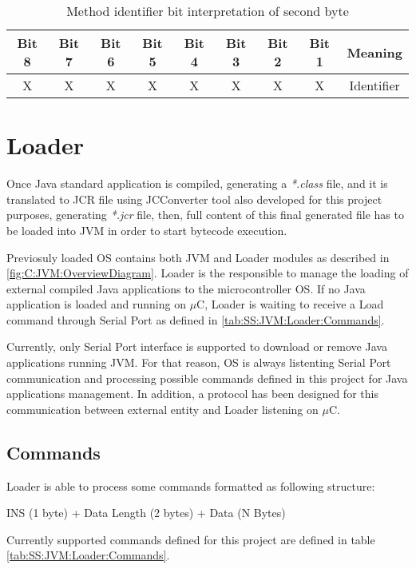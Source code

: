 \begin{table}[!htb]
\centering
\begin{tabular}{|c|c|c|c|c|c|c|c|c|}
\hline 
Bit 8 & Bit 7 & Bit 6 & Bit 5 & Bit 4 & Bit 3 & Bit 2 & Bit 1 & Meaning \\ 
\hline 
X & X & X & X & X & X & X & X & Identifier \\ 
\hline 
\end{tabular}
\caption{Method identifier bit interpretation of second byte}
\label{tab:SS:JVM:JCR:TransBytecodes}
\end{table}

\section{Loader}\label{S:JVM:Loader}
Once Java standard application is compiled, generating a \textit{*.class} file, and it is translated to JCR file using JCConverter tool also developed for this project purposes, generating \textit{*.jcr} file, then, full content of this final generated file has to be loaded into JVM in order to start bytecode execution.

Previosuly loaded OS contains both JVM and Loader modules as described in \ref{fig:C:JVM:OverviewDiagram}. Loader is the responsible to manage the loading of external compiled Java applications to the microcontroller OS. If no Java application is loaded and running on $\mu$C, Loader is waiting to receive a Load command through Serial Port as defined in \ref{tab:SS:JVM:Loader:Commands}.

Currently, only Serial Port interface is supported to download or remove Java applications running JVM. For that reason, OS is always listenting Serial Port communication and processing possible commands defined in this project for Java applications management. In addition, a protocol has been designed for this communication between external entity and Loader listening on $\mu$C.

\subsection{Commands}\label{SS:JVM:Loader:Commands}
Loader is able to process some commands formatted as following structure:

\begin{center}
INS (1 byte) + Data Length (2 bytes) + Data (N Bytes)
\end{center}

Currently supported commands defined for this project are defined in table \ref{tab:SS:JVM:Loader:Commands}.

